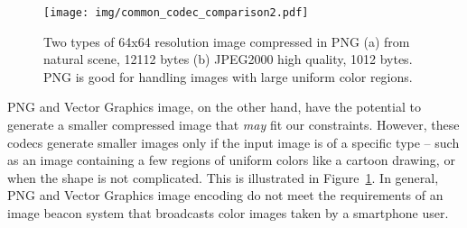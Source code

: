 \begin{figure}[!htb]
    \begin{center}
    	\vspace{-1em}
	    \texttt{[image: img/common\_codec\_comparison2.pdf]}
	    \vspace{-1em}
	    \caption{\footnotesize Two types of 64x64 resolution image compressed in PNG (a) from natural scene, 12112 bytes (b) JPEG2000 high quality, 1012 bytes. PNG is good for handling images with large uniform color regions. }
	    \label{fig:png_block}
	    \vspace{-1em}
    \end{center}
\end{figure}

PNG and Vector Graphics image, on the other hand, have the potential to generate a smaller compressed image that \textit{may} fit our constraints. However, these codecs generate smaller images only if the input image is of a specific type -- such as an image containing a few regions of uniform colors like a cartoon drawing, or when the shape is not complicated. This is illustrated in Figure~\ref{fig:png_block}. In general, PNG and Vector Graphics image encoding do not meet the requirements of an image beacon system that broadcasts color images taken by a smartphone user.

